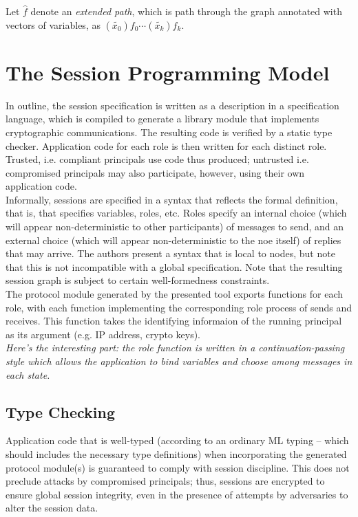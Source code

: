 \documentclass[a4paper,10pt]{article}
\begin{document}
Let $\hat{f}$ denote an \emph{extended path}, which is path through the graph annotated with vectors
of variables, as $(\tilde{x_0}) f_0 \cdots (\tilde{x_k}) f_k$.\\

\section{The Session Programming Model}

In outline, the session specification is written as a description in a specification language, which
is compiled to generate a library module that implements cryptographic communications.  The resulting
code is verified by a static type checker.  Application code for each role is then written for each
distinct role.  Trusted, i.e. compliant principals use code thus produced; untrusted i.e. compromised
principals may also participate, however, using their own application code.\\

Informally, sessions are specified in a syntax that reflects the formal definition, that is, that
specifies variables, roles, etc.  Roles specify an internal choice (which will appear non-deterministic
to other participants) of messages to send, and an external choice (which will appear non-deterministic
to the noe itself) of replies that may arrive.  The authors present a syntax that is local to nodes,
but note that this is not incompatible with a global specification.  Note that the resulting
session graph is subject to certain well-formedness constraints.\\

The protocol module generated by the presented tool exports functions for each role, with each
function implementing the corresponding role process of sends and receives.  This function takes
the identifying informaion of the running principal as its argument (e.g. IP address, crypto keys).\\

\emph{Here's the interesting part: the role function is written in a continuation-passing style
which allows the application to bind variables and choose among messages in each state.}\\

\subsection{Type Checking}

Application code that is well-typed (according to an ordinary ML typing -- which should includes
the necessary type definitions) when incorporating the generated protocol module(s) is guaranteed
to comply with session discipline.  This does not preclude attacks by compromised principals; thus,
sessions are encrypted to ensure global session integrity, even in the presence of attempts by
adversaries to alter the session data.\\
\end{document}
